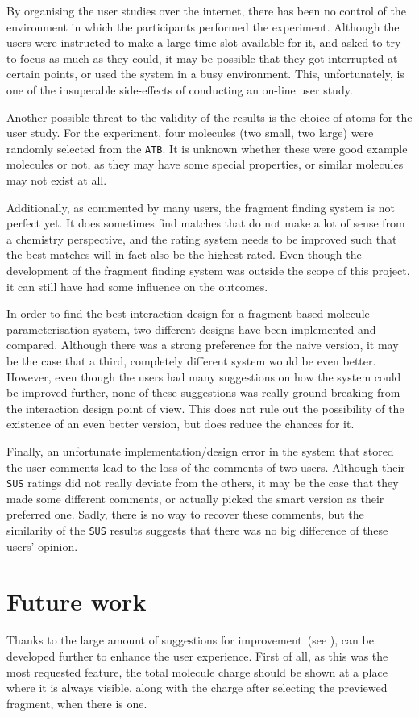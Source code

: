 By organising the user studies over the internet, there has been no control of the environment in which the participants performed the experiment. Although the users were instructed to make a large time slot available for it, and asked to try to focus as much as they could, it may be possible that they got interrupted at certain points, or used the system in a busy environment. This, unfortunately, is one of the insuperable side-effects of conducting an on-line user study.

Another possible threat to the validity of the results is the choice of atoms for the user study. For the experiment, four molecules (two small, two large) were randomly selected from the \verb|ATB|. It is unknown whether these were good example molecules or not, as they may have some special properties, or similar molecules may not exist at all.

Additionally, as commented by many users, the fragment finding system is not perfect yet. It does sometimes find matches that do not make a lot of sense from a chemistry perspective, and the rating system needs to be improved such that the best matches will in fact also be the highest rated. Even though the development of the fragment finding system was outside the scope of this project, it can still have had some influence on the outcomes.

In order to find the best interaction design for a fragment-based molecule parameterisation system, two different designs have been implemented and compared. Although there was a strong preference for the naive version, it may be the case that a third, completely different system would be even better. However, even though the users had many suggestions on how the system could be improved further, none of these suggestions was really ground-breaking from the interaction design point of view. This does not rule out the possibility of the existence of an even better version, but does reduce the chances for it.

Finally, an unfortunate implementation/design error in the system that stored the user comments lead to the loss of the comments of two users. Although their \verb|SUS| ratings did not really deviate from the others, it may be the case that they made some different comments, or actually picked the smart version as their preferred one. Sadly, there is no way to recover these comments, but the similarity of the \verb|SUS| results suggests that there was no big difference of these users' opinion.


\section{Future work}
Thanks to the large amount of suggestions for improvement~(see ), \oframp{} can be developed further to enhance the user experience. First of all, as this was the most requested feature, the total molecule charge should be shown at a place where it is always visible, along with the charge after selecting the previewed fragment, when there is one.

